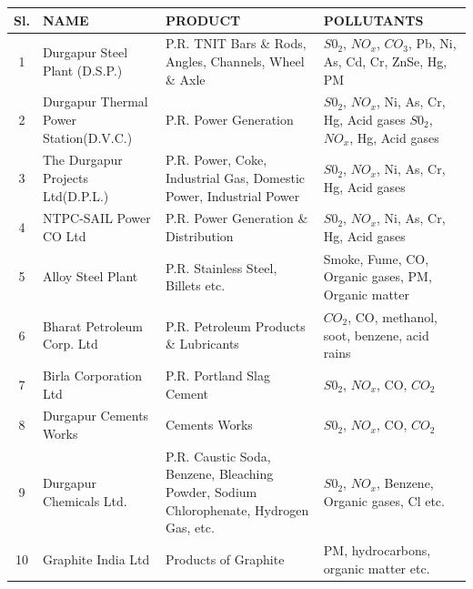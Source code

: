 \begin{center}
 \begin{tabular}{| c |  p{4cm} | p{4cm} | p{4cm}| } 
 \hline
 Sl. & NAME & PRODUCT & POLLUTANTS \\ [0.5ex] 
 \hline\hline
 1 & Durgapur Steel Plant (D.S.P.) & P.R. TNIT Bars \& Rods, Angles, Channels, Wheel \& Axle & $S0_2$, $NO_x$, $CO_3$, Pb, Ni, As, Cd, Cr, ZnSe, Hg, PM \\ 
 \hline
 2 & Durgapur Thermal Power Station(D.V.C.) & P.R. Power Generation & $S0_2$, $NO_x$, Ni, As, Cr, Hg, Acid gases $S0_2$, $NO_x$, Hg, Acid gases \\
 \hline
 3 & The Durgapur Projects Ltd(D.P.L.)  & P.R. Power, Coke, Industrial Gas, Domestic Power, Industrial Power & $S0_2$, $NO_x$, Ni, As, Cr, Hg, Acid gases \\
 \hline
 4 & NTPC-SAIL Power CO Ltd & P.R. Power Generation \& Distribution & $S0_2$, $NO_x$, Ni, As, Cr, Hg, Acid gases \\
 \hline
 5 & Alloy Steel Plant & P.R. Stainless Steel, Billets etc. & Smoke, Fume, CO, Organic 
gases, PM, Organic matter \\
 \hline
 6 & Bharat Petroleum Corp. Ltd  & P.R. Petroleum Products \& Lubricants & $CO_2$, CO, methanol, soot, benzene, acid rains \\
 \hline
 7 & Birla Corporation Ltd  & P.R. Portland Slag Cement & $S0_2$, $NO_x$, CO, $CO_2$ \\
\hline
 8 & Durgapur Cements Works  & Cements Works & $S0_2$, $NO_x$, CO, $CO_2$ \\ 
\hline
 9 & Durgapur Chemicals Ltd.  & P.R. Caustic Soda, Benzene, Bleaching Powder, Sodium Chlorophenate, Hydrogen Gas, etc. & $S0_2$, $NO_x$, Benzene, Organic gases, Cl etc. \\
\hline
 10 & Graphite India Ltd  &Products of Graphite & PM, hydrocarbons, organic matter etc. \\  [1ex] 
 \hline
\end{tabular}
\end{center}